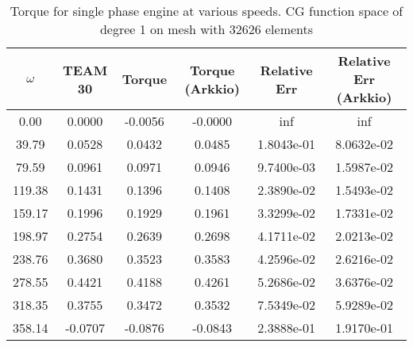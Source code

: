\begin{table}[!ht]
\centering
\caption{Torque for single phase engine at various speeds. CG function space of degree 1 on mesh with 32626 elements}
\label{tab:torque:single}
\begin{tabular}{cccccc}
\toprule
$\omega$ & TEAM 30 &  Torque & Torque (Arkkio) & Relative Err & Relative Err (Arkkio) \\
\midrule
    0.00 &  0.0000 & -0.0056 &         -0.0000 &          inf &                   inf \\
   39.79 &  0.0528 &  0.0432 &          0.0485 &   1.8043e-01 &            8.0632e-02 \\
   79.59 &  0.0961 &  0.0971 &          0.0946 &   9.7400e-03 &            1.5987e-02 \\
  119.38 &  0.1431 &  0.1396 &          0.1408 &   2.3890e-02 &            1.5493e-02 \\
  159.17 &  0.1996 &  0.1929 &          0.1961 &   3.3299e-02 &            1.7331e-02 \\
  198.97 &  0.2754 &  0.2639 &          0.2698 &   4.1711e-02 &            2.0213e-02 \\
  238.76 &  0.3680 &  0.3523 &          0.3583 &   4.2596e-02 &            2.6216e-02 \\
  278.55 &  0.4421 &  0.4188 &          0.4261 &   5.2686e-02 &            3.6376e-02 \\
  318.35 &  0.3755 &  0.3472 &          0.3532 &   7.5349e-02 &            5.9289e-02 \\
  358.14 & -0.0707 & -0.0876 &         -0.0843 &   2.3888e-01 &            1.9170e-01 \\
\bottomrule
\end{tabular}
\end{table}


